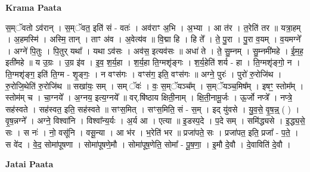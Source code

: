 \documentclass[17pt]{extarticle}
\begin{document}
\textbf{Krama Paata} \newline

स॒म्ॅवतो ऽव॑रान् । स॒म्ॅवत॒ इति॑ सं - वतः॑ । अव॑राꣳ अ॒भि । अ॒भ्या । आ त॑र । त॒रेति॑ तर ॥ यत्रा॒हम् । अ॒हमस्मि॑ । अस्मि॒ तान् । ताꣳ अ॑व । अ॒वेत्य॑व ॥ वि॒द्मा हि । हि ते᳚ । ते॒ पु॒रा । पु॒रा व॒यम् । व॒यमग्ने᳚ । अग्ने॑ पि॒तुः । पि॒तुर् यथा᳚ । यथा ऽव॑सः । अव॑स॒ इत्यव॑सः ॥ अधा॑ ते । ते॒ सु॒म्नम् । सु॒म्नमी॑महे । ई॒म॒ह॒ इती॑महे ॥ य उ॒ग्रः । उ॒ग्र इ॑व । इ॒व॒ श॒र्य॒हा । श॒र्य॒हा ति॒ग्मशृ॑ङ्गः । श॒र्य॒हेति॑ शर्य - हा । ति॒ग्मशृ॑ङ्गो॒ न । ति॒ग्मशृ॑ङ्ग॒ इति॑ ति॒ग्म - शृ॒ङ्गः॒ । न वꣳस॑गः । वꣳस॑ग॒ इति॒ वꣳस॑गः ॥ अग्ने॒ पुरः॑ । पुरो॑ रु॒रोजि॑थ । रु॒रोजि॒थेति॑ रु॒रोजि॑थ ॥ सखा॑यः॒ सम् । सम् ॅवः॑ । वः॒ स॒म्ॅयञ्च᳚म् । स॒म्ॅयञ्च॒मिष᳚म् । इषꣳ॒॒ स्तोम᳚म् । स्तोम॑म् च । चा॒ग्नये᳚ । अ॒ग्नय॒ इत्य॒ग्नये᳚ ॥ वर्.षि॑ष्ठाय क्षिती॒नाम् । क्षि॒ती॒नामू॒र्जः । ऊ॒र्जो नप्त्रे᳚ । नप्त्रे॒ सह॑स्वते । सह॑स्वत॒ इति॒ सह॑स्वते ॥ सꣳस॒मित् । सꣳस॒मिति॒ सं - स॒म् । इद् यु॑वसे । यु॒व॒से॒ वृ॒ष॒न्न्॒ ( ) । वृ॒ष॒न्नग्ने᳚ । अग्ने॒ विश्वा॑नि । विश्वा᳚न्य॒र्यः । अ॒र्य आ । एत्या ॥ इ॒डस्प॒दे । प॒दे सम् । समि॑द्ध्यसे । इ॒द्ध्य॒से॒ सः । स नः॑ । नो॒ वसू॑नि । वसू॒न्या । आ भ॑र । भ॒रेति॑ भर ॥ प्रजा॑पते॒ सः । प्रजा॑पत॒ इति॒ प्रजा᳚ - प॒ते॒ । स वे॑द । वे॒द॒ सोमा॑पूषणा । सोमा॑पूषणे॒मौ । सोमा॑पूष॒णेति॒ सोमा᳚ - पू॒ष॒णा॒ । इ॒मौ दे॒वौ । दे॒वाविति॑ दे॒वौ । \newline

\textbf{Jatai Paata} \newline
\end{document}
